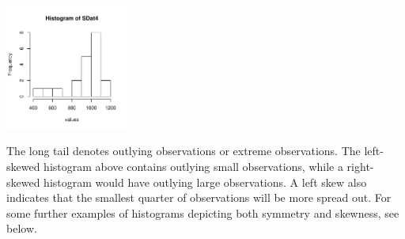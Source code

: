 \documentclass[11pt, chapterprefix=true]{scrbook}\usepackage[]{graphicx}\usepackage[]{color}
\begin{document}
{\centering \includegraphics[width=4cm]{figure/LBL2l-1} 

}




The long tail denotes outlying observations or extreme observations.  The left-skewed histogram above contains outlying small observations, while a right-skewed histogram would have outlying large observations.  A left skew also indicates that the smallest quarter of observations will be more spread out. For some further examples of histograms depicting both symmetry and skewness, see below.

\vspace{3mm}
\end{document}
